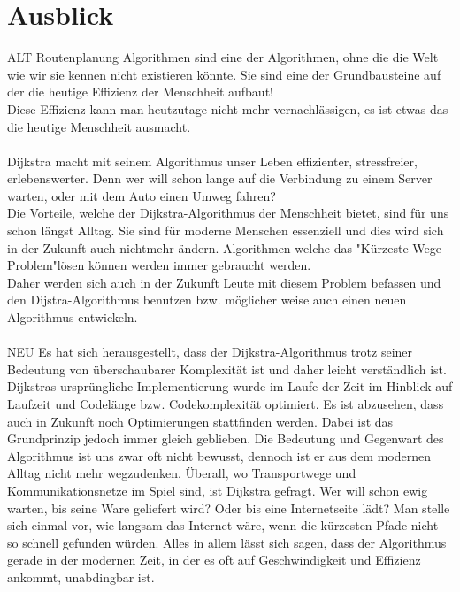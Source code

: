 \chapter{Ausblick}
ALT
Routenplanung Algorithmen sind eine der Algorithmen, ohne die die Welt wie wir sie kennen nicht existieren könnte. Sie sind eine der Grundbausteine auf der die heutige Effizienz der Menschheit aufbaut! \\ 
Diese Effizienz kann man heutzutage nicht mehr vernachlässigen, es ist etwas das die heutige Menschheit ausmacht. \\
\\
Dijkstra macht mit seinem Algorithmus unser Leben effizienter, stressfreier, erlebenswerter. Denn wer will schon lange auf die Verbindung zu einem Server warten, oder mit dem Auto einen Umweg fahren? \\
Die Vorteile, welche der Dijkstra-Algorithmus der Menschheit bietet, sind für uns schon längst Alltag. Sie sind für moderne Menschen essenziell und dies wird sich in der Zukunft auch nichtmehr ändern. Algorithmen welche das "Kürzeste Wege Problem"lösen können werden immer gebraucht werden. \\
Daher werden sich auch in der Zukunft Leute mit diesem Problem befassen und den Dijstra-Algorithmus benutzen bzw. möglicher weise auch einen neuen Algorithmus entwickeln.
\\
\\
NEU
Es hat sich herausgestellt, dass der Dijkstra-Algorithmus trotz seiner Bedeutung von überschaubarer Komplexität ist und daher leicht verständlich ist.
Dijkstras ursprüngliche Implementierung wurde im Laufe der Zeit im Hinblick auf Laufzeit und Codelänge bzw.  Codekomplexität optimiert. Es ist abzusehen, dass auch in Zukunft noch Optimierungen stattfinden werden.
Dabei ist das Grundprinzip jedoch immer gleich geblieben. Die Bedeutung und Gegenwart des Algorithmus ist uns zwar oft nicht bewusst, dennoch ist er aus dem modernen Alltag nicht mehr wegzudenken.
Überall, wo Transportwege und Kommunikationsnetze im Spiel sind, ist Dijkstra gefragt. Wer will schon ewig warten, bis seine Ware geliefert wird? Oder bis eine Internetseite lädt? Man stelle sich einmal vor, wie langsam das Internet wäre, wenn die kürzesten Pfade nicht so schnell gefunden würden.
Alles in allem lässt sich sagen, dass der Algorithmus gerade in der modernen Zeit, in der es oft auf Geschwindigkeit und Effizienz ankommt, unabdingbar ist.

